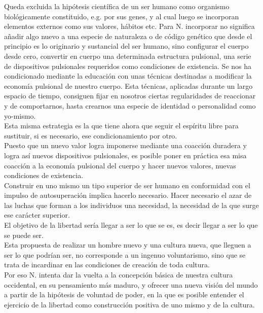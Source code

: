 \documentclass[a4paper, 10pt, twocolumn, spanish]{article}
\begin{document}
Queda excluida la hipótesis científica de un ser humano como organismo
biológicamente constituido, e.g. por sus genes, y al cual luego se
incorporan elementos externos como sus valores, hábitos etc. Para
N. incorporar no significa añadir algo nuevo a una especie de
naturaleza o de código genético que desde el principio es lo
originario y sustancial del ser humano, sino configurar el cuerpo
desde cero, convertir en cuerpo una determinada estructura pulsional,
una serie de dispositivos pulsionales requeridos como condiciones de
existencia. Se nos ha condicionado mediante la educación con unas
técnicas destinadas a modificar la economía pulsional de nuestro
cuerpo. Esta técnicas, aplicadas durante un largo espacio de tiempo,
consiguen fijar en nosotros ciertas regularidades de reaccionar y de
comportarnos, hasta crearnos una especie de identidad o personalidad
como yo-mismo.\\[0pt]
Esta misma estrategia es la que tiene ahora que seguir el espíritu
libre para sustituir, si es necesario, ese condicionamiento por
otro.\\[0pt]
Puesto que un nuevo valor logra imponerse mediante una coacción
duradera y logra así nuevos dispositivos pulsionales, es posible poner
en práctica esa misa coacción a la economía pulsional del cuerpo y
hacer nuevos valores, nuevas condiciones de existencia.\\[0pt]

Construir en uno mismo un tipo superior de ser humano en conformidad
con el impulso de autosuperación implica hacerlo necesario. Hacer
necesario el azar de las luchas que forman a los individuos una
necesidad, la necesidad de la que surge ese carácter superior.\\[0pt]
El objetivo de la libertad sería llegar a ser lo que se es, es decir
llegar a ser lo que se puede ser.\\[0pt]

Esta propuesta de realizar un hombre nuevo y una cultura nueva, que
lleguen a ser lo que podrían ser, no corresponde a un ingenuo
voluntarismo, sino que se trata de incardinar en las condiciones de
creación de toda cultura.\\[0pt]
Por eso N. intenta dar la vuelta a la concepción básica de nuestra
cultura occidental, en su pensamiento más maduro, y ofrecer una nueva
visión del mundo a partir de la hipótesis de voluntad de poder, en la
que es posible entender el ejercicio de la libertad como construcción
positiva de uno mismo y de la cultura.\\[0pt]
\end{document}
